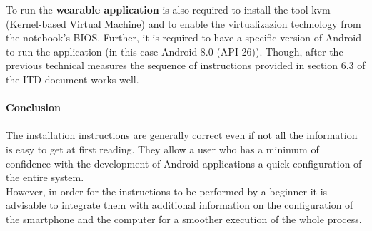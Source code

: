 To run the \textbf{wearable application} is also required to install the tool kvm (Kernel-based Virtual Machine) and to enable the virtualizazion technology from the notebook's BIOS. Further, it is required to have a specific version of Android to run the application (in this case Android 8.0 (API 26)). Though, after the previous technical measures the sequence of instructions provided in section 6.3 of the ITD document works well.\\\\
\textbf{Conclusion}\\\\
The installation instructions are generally correct even if not all the information is easy to get at first reading. They allow a user who has a minimum of confidence with the development of Android applications a quick configuration of the entire system.\\
However, in order for the instructions to be performed by a beginner it is advisable to integrate them with additional information on the configuration of the smartphone and the computer for a smoother execution of the whole process.\\
